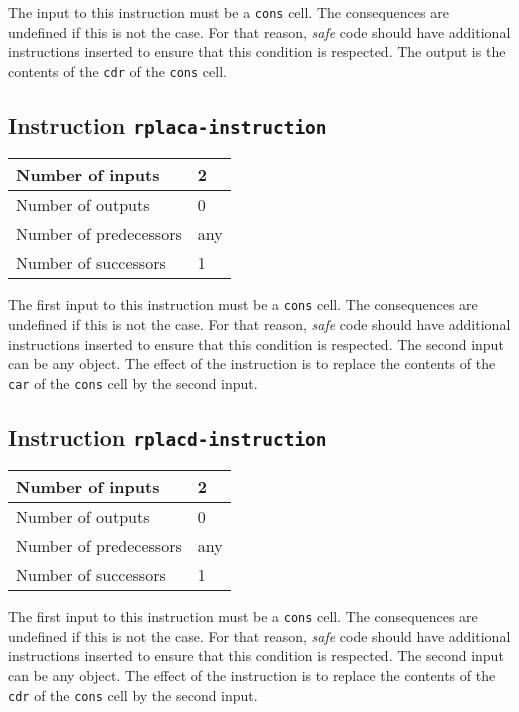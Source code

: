 The input to this instruction must be a \texttt{cons} cell. The
consequences are undefined if this is not the case.  For that reason,
\emph{safe} code should have additional instructions inserted to
ensure that this condition is respected.  The output is the contents
of the \texttt{cdr} of the \texttt{cons} cell.

\subsection{Instruction \texttt{rplaca-instruction}}
\label{hir-instruction-rplaca}

\begin{tabular}{|l|l|}
\hline
Number of inputs & 2\\
\hline
Number of outputs & 0\\
\hline
Number of predecessors & any\\
\hline
Number of successors & 1\\
\hline
\end{tabular}

The first input to this instruction must be a \texttt{cons} cell.  The
consequences are undefined if this is not the case.  For that reason,
\emph{safe} code should have additional instructions inserted to
ensure that this condition is respected.  The second input can be any
object.  The effect of the instruction is to replace the contents of
the \texttt{car} of the \texttt{cons} cell by the second input.

\subsection{Instruction \texttt{rplacd-instruction}}
\label{hir-instruction-rplacd}

\begin{tabular}{|l|l|}
\hline
Number of inputs & 2\\
\hline
Number of outputs & 0\\
\hline
Number of predecessors & any\\
\hline
Number of successors & 1\\
\hline
\end{tabular}

The first input to this instruction must be a \texttt{cons} cell.  The
consequences are undefined if this is not the case.  For that reason,
\emph{safe} code should have additional instructions inserted to
ensure that this condition is respected.  The second input can be any
object.  The effect of the instruction is to replace the contents of
the \texttt{cdr} of the \texttt{cons} cell by the second input.

